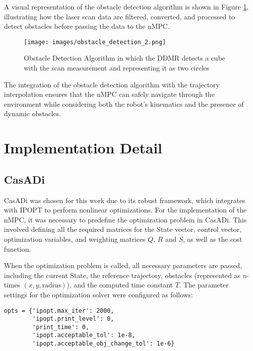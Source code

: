 \documentclass[conference]{IEEEtran}
\begin{document}
A visual representation of the obstacle detection algorithm is shown in Figure \ref{fig:Obstacle_Detection}, illustrating how the laser scan data are filtered, converted, and processed to detect obstacles before passing the data to the nMPC.

\begin{figure}[!h]
    \centering
    \texttt{[image: images/obstacle\_detection\_2.png]}
    \caption{Obstacle Detection Algorithm in which the DDMR detects a cube with the scan measurement and representing it as two circles}
    \label{fig:Obstacle_Detection}
\end{figure}

The integration of the obstacle detection algorithm with the trajectory interpolation ensures that the nMPC can safely navigate through the environment while considering both the robot’s kinematics and the presence of dynamic obstacles.


\section{Implementation Detail}
\subsection{CasADi}

CasADi was chosen for this work due to its robust framework, which integrates with IPOPT to perform nonlinear optimizations. For the implementation of the nMPC, it was necessary to predefine the optimization problem in CasADi. This involved defining all the required matrices for the State vector, control vector, optimization variables, and weighting matrices \( Q \), \( R \) and \( S \), as well as the cost function.

When the optimization problem is called, all necessary parameters are passed, including the current State, the reference trajectory, obstacles (represented as \( n \)-times \((x, y, \text{radius})\)), and the computed time constant \( T \). The parameter settings for the optimization solver were configured as follows:

\begin{lstlisting}
opts = {'ipopt.max_iter': 2000,
        'ipopt.print_level': 0,
        'print_time': 0,
        'ipopt.acceptable_tol': 1e-8,
        'ipopt.acceptable_obj_change_tol': 1e-6}
\end{lstlisting}
\end{document}
